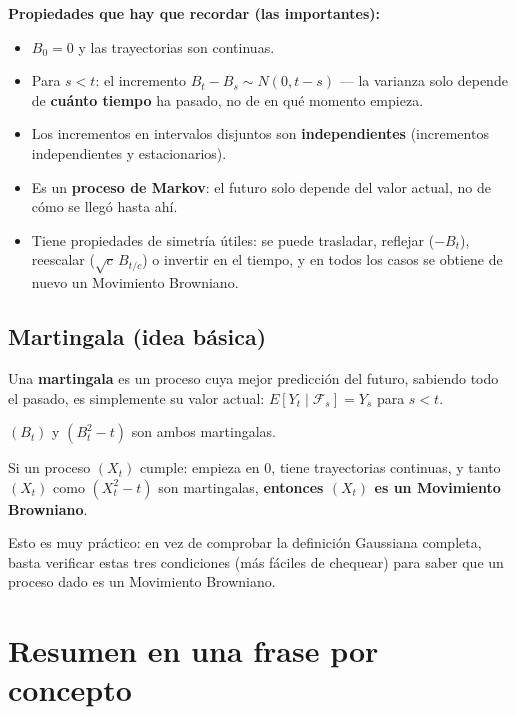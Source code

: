 \documentclass[10pt]{book}
\begin{document}
\noindent
\textbf{Propiedades que hay que recordar (las importantes):}
\begin{itemize}
    \item $B_0=0$ y las trayectorias son continuas.
    \item Para $s<t$: el incremento $B_t-B_s \sim N(0,t-s)$ — la varianza solo depende de \textbf{cuánto tiempo} ha pasado, no de en qué momento empieza.
    \item Los incrementos en intervalos disjuntos son \textbf{independientes} (incrementos independientes y estacionarios).
    \item Es un \textbf{proceso de Markov}: el futuro solo depende del valor actual, no de cómo se llegó hasta ahí.
    \item Tiene propiedades de simetría útiles: se puede trasladar, reflejar ($-B_t$), reescalar ($\sqrt{c}\,B_{t/c}$) o invertir en el tiempo, y en todos los casos se obtiene de nuevo un Movimiento Browniano.
\end{itemize}

\subsection*{Martingala (idea básica)}
Una \textbf{martingala} es un proceso cuya mejor predicción del futuro, sabiendo todo el pasado, es simplemente su valor actual: $E[Y_t\mid \mathcal{F}_s]=Y_s$ para $s<t$.

\begin{teo}
$(B_t)$ y $(B_t^2-t)$ son ambos martingalas.
\end{teo}

\begin{teo}
Si un proceso $(X_t)$ cumple: empieza en $0$, tiene trayectorias continuas, y tanto $(X_t)$ como $(X_t^2-t)$ son martingalas, \textbf{entonces $(X_t)$ es un Movimiento Browniano}.
\end{teo}

\begin{observacion}
Esto es muy práctico: en vez de comprobar la definición Gaussiana completa, basta verificar estas tres condiciones (más fáciles de chequear) para saber que un proceso dado es un Movimiento Browniano.
\end{observacion}

\section{Resumen en una frase por concepto}
\end{document}
